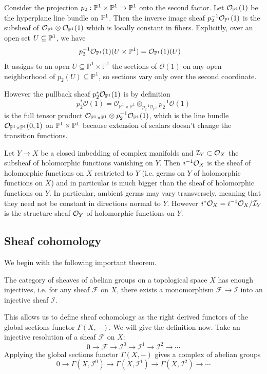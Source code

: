 \documentclass[12pt]{article}
\begin{document}
\begin{example}
     Consider the projection $p_2: \P^1 \times \P^1 \to \P^1$ onto the second factor. Let $\mathcal{O}_{\P^1}(1)$ be the hyperplane line bundle on $\P^1$. Then the inverse image sheaf $p_2^{-1} \mathcal{O}_{\P^1}(1)$ is the subsheaf of $\cO_{\P^1} \otimes \cO_{\P^1}(1)$ which is locally constant in fibers. Explicitly, over an open set $U \subseteq \P^1$, we have \begin{align*}
        p_2^{-1} \mathcal{O}_{\P^1}(1)(U \times \P^1) & = \mathcal{O}_{\P^1}(1)(U)
    \end{align*} It assigns to an open $U \subseteq \mathbb P^1\times\mathbb P^1$ the sections of $\mathcal O(1)$ on any open neighborhood of $p_2(U)\subseteq \mathbb P^1$, so sections vary only over the second coordinate.
    
    However the pullback sheaf $p_2^* \mathcal{O}_{\P^1}(1)$ 
is by definition \[p_2^{*}\mathcal O(1) = \mathcal O_{\mathbb P^1 \times \mathbb P^1}
\otimes_{p_2^{-1}\mathcal O_{\mathbb P^1}}
p_2^{-1}\mathcal O(1)\]
    is the full tensor product $\cO_{\P^1 \times \P^1} \otimes p_2^{-1} \mathcal{O}_{\P^1}(1)$, which is the line bundle $\mathcal{O}_{\P^1 \times \P^1}(0,1)$ on $\P^1 \times \P^1$ because extension of scalars doesn't change the transition functions.
\end{example}

\begin{example}
     Let $Y \to X$ be a closed imbedding of complex manifolds and $\cI_Y \subset \cO_X$ the subsheaf of holomorphic functions vanishing on $Y$. Then $i^{-1} \cO_X$ is the sheaf of holomorphic functions on $X$ restricted to $Y$ (i.e. germs on $Y$ of holomorphic functions on $X$) and in particular is much bigger than the sheaf of holomorphic functions on $Y$. In particular, ambient germs may vary transversely, meaning that they need not be constant in directions normal to $Y$. However $i^* \cO_X = i^{-1} \cO_X / \cI_Y$ is the structure sheaf $\cO_Y$ of holomorphic functions on $Y$.
\end{example}

\subsection{Sheaf cohomology}
We begin with the following important theorem.
\begin{theorem}
    The category of sheaves of abelian groups on a topological space $X$ has enough injectives, i.e. for any sheaf $\mathcal{F}$ on $X$, there exists a monomorphism $\mathcal{F} \to \mathcal{I}$ into an injective sheaf $\mathcal{I}$.
\end{theorem}
This allows us to define sheaf cohomology as the right derived functors of the global sections functor $\Gamma(X, -)$. We will give the definition now. Take an injective resolution of a sheaf $\mathcal{F}$ on $X$:
\[0 \to \mathcal{F} \to \mathcal{I}^0 \to \mathcal{I}^1 \to \mathcal{I}^2 \to \cdots\]
Applying the global sections functor $\Gamma(X, -)$ gives a complex of abelian groups
\[0 \to \Gamma(X, \mathcal{I}^0) \to \Gamma(X, \mathcal{I}^1) \to \Gamma(X, \mathcal{I}^2) \to \cdots\]
\end{document}
